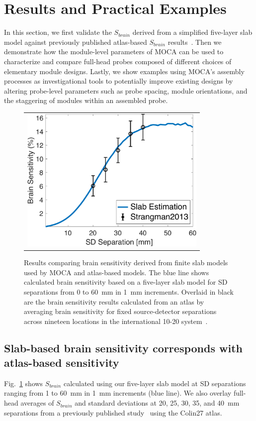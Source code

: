 \section{Results and Practical Examples}
\label{sec:results}
In this section, we first validate the $S_{brain}$ derived from a simplified five-layer slab model against previously published atlas-based $S_{brain}$ results~\cite{Strangman2013}. Then we demonstrate how the module-level parameters of \ac{MOCA} can be used to characterize and compare full-head probes composed of different choices of elementary module designs. Lastly, we show examples using \ac{MOCA}'s assembly processes as investigational tools to potentially improve existing designs by altering probe-level parameters such as probe spacing, module orientations, and the staggering of modules within an assembled probe.

\begin{figure}
    \begin{center}
    \begin{tabular}{c}
    \includegraphics[width=9cm]{fig/moca/Fig_3.pdf}
    \end{tabular}
    \end{center}
    \caption {Results comparing brain sensitivity derived from finite slab models used by MOCA and atlas-based models. The blue line shows calculated brain sensitivity based on a five-layer slab model for \ac{SD} separations from 0 to 60~mm in 1~mm increments. Overlaid in black are the brain sensitivity results calculated from an atlas by averaging brain sensitivity for fixed source-detector separations across nineteen locations in the international 10-20 system~\cite{Strangman2013}. } 
    \label{fig:BScomparison}
\end{figure} 

\subsection{Slab-based brain sensitivity corresponds with atlas-based sensitivity}
Fig.~\ref{fig:BScomparison} shows $S_{brain}$ calculated using our five-layer slab model at \ac{SD} separations ranging from 1 to 60~mm in 1~mm increments (blue line). We also overlay full-head averages of $S_{brain}$ and standard deviations at 20, 25, 30, 35, and 40~mm separations from a previously published study~\cite{Strangman2013} using the Colin27 atlas.

